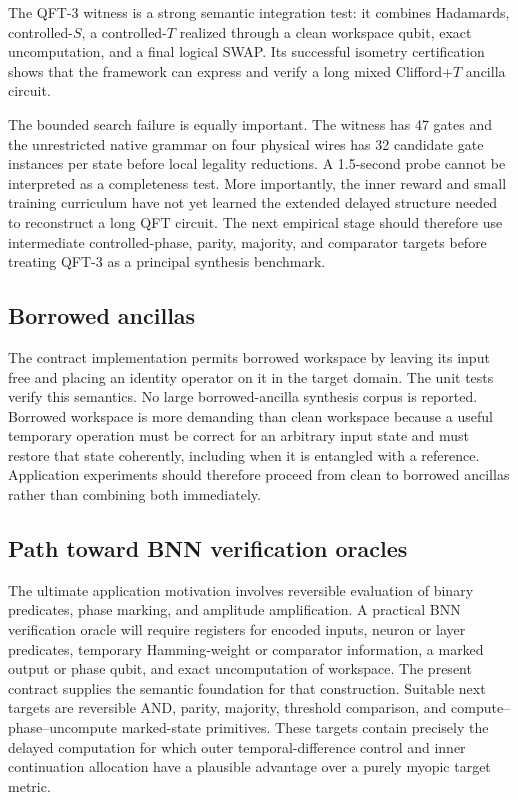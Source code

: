 The QFT-3 witness is a strong semantic integration test: it combines Hadamards, controlled-$S$, a controlled-$T$ realized through a clean workspace qubit, exact uncomputation, and a final logical SWAP. Its successful isometry certification shows that the framework can express and verify a long mixed Clifford+$T$ ancilla circuit.

The bounded search failure is equally important. The witness has 47 gates and the unrestricted native grammar on four physical wires has 32 candidate gate instances per state before local legality reductions. A 1.5-second probe cannot be interpreted as a completeness test. More importantly, the inner reward and small training curriculum have not yet learned the extended delayed structure needed to reconstruct a long QFT circuit. The next empirical stage should therefore use intermediate controlled-phase, parity, majority, and comparator targets before treating QFT-3 as a principal synthesis benchmark.

\subsection{Borrowed ancillas}

The contract implementation permits borrowed workspace by leaving its input free and placing an identity operator on it in the target domain. The unit tests verify this semantics. No large borrowed-ancilla synthesis corpus is reported. Borrowed workspace is more demanding than clean workspace because a useful temporary operation must be correct for an arbitrary input state and must restore that state coherently, including when it is entangled with a reference. Application experiments should therefore proceed from clean to borrowed ancillas rather than combining both immediately.

\subsection{Path toward BNN verification oracles}

The ultimate application motivation involves reversible evaluation of binary predicates, phase marking, and amplitude amplification. A practical BNN verification oracle will require registers for encoded inputs, neuron or layer predicates, temporary Hamming-weight or comparator information, a marked output or phase qubit, and exact uncomputation of workspace. The present contract supplies the semantic foundation for that construction. Suitable next targets are reversible AND, parity, majority, threshold comparison, and compute--phase--uncompute marked-state primitives. These targets contain precisely the delayed computation for which outer temporal-difference control and inner continuation allocation have a plausible advantage over a purely myopic target metric.


